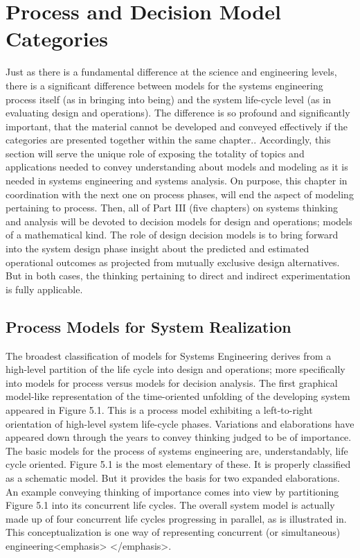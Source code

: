 \section{Process and Decision Model Categories}

Just as there is a fundamental difference at the science and engineering levels, there is a significant difference between models for the systems engineering process itself (as in bringing into being) and the system life-cycle level (as in evaluating design and operations). The difference is so profound and significantly important, that the material cannot be developed and conveyed effectively if the categories are presented together within the same chapter..
Accordingly, this section will serve the unique role of exposing the totality of topics and applications needed to convey understanding about models and modeling as it is needed in systems engineering and systems analysis. On purpose, this chapter in coordination with the next one on process phases, will end the aspect of modeling pertaining to process. Then, all of Part III (five chapters) on systems thinking and analysis will be devoted to decision models for design and operations; models of a mathematical kind. The role of design decision models is to bring forward into the system design phase insight about the predicted and estimated operational outcomes as projected from mutually exclusive design alternatives. But in both cases, the thinking pertaining to direct and indirect experimentation is fully applicable.

\subsection{Process Models for System Realization}

The broadest classification of models for Systems Engineering derives from a high-level partition of the life cycle into design and operations; more specifically into models for process versus models for decision analysis.
	The first graphical model-like representation of the time-oriented unfolding of the developing system appeared in Figure 5.1. This is a process model exhibiting a left-to-right orientation of high-level system life-cycle phases. Variations and elaborations have appeared down through the years to convey thinking judged to be of importance. 
The basic models for the process of systems engineering are, understandably, life cycle oriented. Figure 5.1 is the most elementary of these. It is properly classified as a schematic model. But it provides the basis for two expanded elaborations.
An example conveying thinking of importance comes into view by partitioning Figure 5.1 into its concurrent life cycles. The overall system model is actually made up of four concurrent life cycles progressing in parallel, as is illustrated in. This conceptualization is one way of representing concurrent (or simultaneous) engineering<emphasis> </emphasis>.

